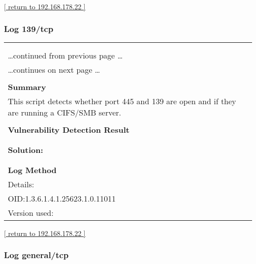 \documentclass{article}
\begin{document}
\begin{footnotesize}\hyperref[host:192.168.178.22]{[ return to 192.168.178.22 ]}\end{footnotesize}
\subsubsection{Log 139/tcp}
\label{port:192.168.178.22 139/tcp Log}

\begin{longtable}{|p{}|}
\hline
\rowcolor{gvm_log}{\color{white}{Log (CVSS: 0.0) }}\\
\rowcolor{gvm_log}{\color{white}{NVT: SMB/CIFS Server Detection}}\\
\hline
\endfirsthead
\hfill\ldots continued from previous page \ldots \\
\hline
\endhead
\hline
\ldots continues on next page \ldots \\
\endfoot
\hline
\endlastfoot
\\
\textbf{Summary}\\
This script detects whether port 445 and 139 are open and
  if they are running a CIFS/SMB server.\\

        \hline
        \\
\textbf{Vulnerability Detection Result}\\
\rowcolor{white}{\verb=A SMB server is running on this port=}\\

          \hline
          \\
\textbf{Solution:}\\
\\


        \hline
        \\
\textbf{Log Method}\\
Details:
\rowcolor{white}{\verb=SMB/CIFS Server Detection=}\\
OID:1.3.6.1.4.1.25623.1.0.11011\\
Version used:
\rowcolor{white}{\verb=2020-11-10T15:30:28Z=}\\
\end{longtable}

\begin{footnotesize}\hyperref[host:192.168.178.22]{[ return to 192.168.178.22 ]}\end{footnotesize}
\subsubsection{Log general/tcp}
\label{port:192.168.178.22 general/tcp Log}
\end{document}

